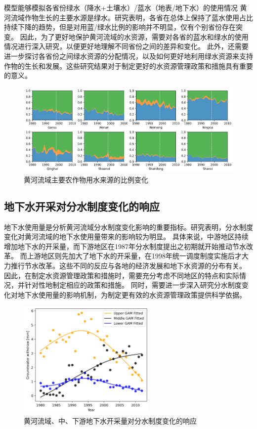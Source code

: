 模型能够模拟各省份绿水（降水+土壤水）/蓝水（地表/地下水）的使用情况
黄河流域作物生长的主要水源是绿水。研究表明，各省在总体上保持了蓝水使用占比持续下降的趋势，但是对用蓝/绿水比例的影响并不明显，仅有个别省份存在突变。
因此，为了更好地保护黄河流域的水资源，需要对各省的蓝水和绿水的使用情况进行深入研究，以便更好地理解不同省份之间的差异和变化。
此外，还需要进一步探讨各省份之间绿水资源的分配情况，以及如何更好地利用绿水资源来支持作物的生长和发展。这些研究结果对于制定更好的水资源管理政策和措施具有重要的意义。

\begin{figure}[htb]
    \centering
    \includegraphics[width=\textwidth]{img/ch6/ch6_green_blue_water.png}
    \caption{黄河流域主要农作物用水来源的比例变化}\label{ch6:fig:sources}
\end{figure}

\subsection{地下水开采对分水制度变化的响应}

地下水使用量是分析黄河流域分水制度变化影响的重要指标。研究表明，分水制度变化对黄河流域的地下水使用量带来的影响较为明显。
具体来说，中游地区持续增加地下水的开采量，而下游地区在1987年分水制度提出之初期就开始推动节水改革。
而上游地区则先加大了地下水的开采量，在1998年统一调度制度实施后才大力推行节水改革。这些不同的反应与各地的经济发展和地下水资源的分布有关。
因此，在制定水资源管理政策和措施时，需要充分考虑不同地区的特点和实际情况，并针对性地制定相应的政策和措施。
同时，需要进一步深入研究分水制度变化对地下水使用量的影响机制，为制定更有效的水资源管理政策提供科学依据。

\begin{figure}[htb]
    \centering
    \includegraphics[width=0.6\textwidth]{img/ch6/ch6_groundwater.png}
    \caption{黄河流域、中、下游地下水开采量对分水制度变化的响应}\label{ch6:fig:groundwater}
\end{figure}
